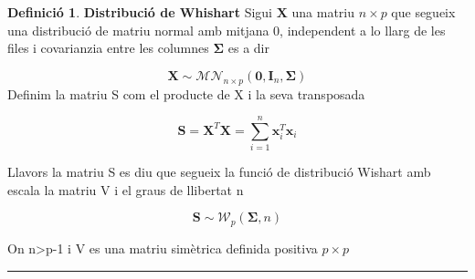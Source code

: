 \documentclass[
  catalan,
]{article}
\theoremstyle{definition}
\newtheorem{definition}{Definició}[section]
\theoremstyle{definition}
\theoremstyle{definition}
\theoremstyle{definition}
\theoremstyle{remark}
\begin{document}
\begin{definition}
\textbf{Distribució de Whishart}
Sigui \(\mathbf{X}\) una matriu \(n \times p\) que segueix una distribució de matriu normal amb mitjana 0, independent a lo llarg de les files i covarianzia entre les columnes \(\boldsymbol{\Sigma}\) es a dir

\[
\mathbf{X} \sim \mathcal{MN}_{n \times p}(\mathbf{0}, \mathbf{I}_n, \boldsymbol{\Sigma})
\]
Definim la matriu S com el producte de X i la seva transposada

\[
\mathbf{S} = \mathbf{X}^T \mathbf{X} = \sum_{i=1}^{n} \mathbf{x}_i^T \mathbf{x}_i
\]

Llavors la matriu S es diu que segueix la funció de distribució Wishart amb escala la matriu V i el graus de llibertat n

\[
\mathbf{S} \sim \mathcal{W}_p(\boldsymbol{\Sigma}, n)
\]

On n\textgreater p-1 i V es una matriu simètrica definida positiva \(p \times p\)
\end{definition}

\begin{center}\rule{0.5\linewidth}{0.5pt}\end{center}
\end{document}

